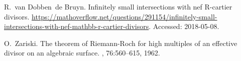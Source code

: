 \documentclass[11pt]{amsart}
\begin{document}
\begin{thebibliography}{10}
	R.~van Dobben~de Bruyn.
	\newblock Infinitely small intersections with nef {R}-cartier divisors.
	\newblock
	\url{https://mathoverflow.net/questions/291154/infinitely-small-intersections-with-nef-mathbb-r-cartier-divisors}.
	\newblock Accessed: 2018-05-08.
	
	O.~Zariski.
	\newblock The theorem of {R}iemann-{R}och for high multiples of an effective
	divisor on an algebraic surface.
	, 76:560--615, 1962.
	
\end{thebibliography}
\end{document}
